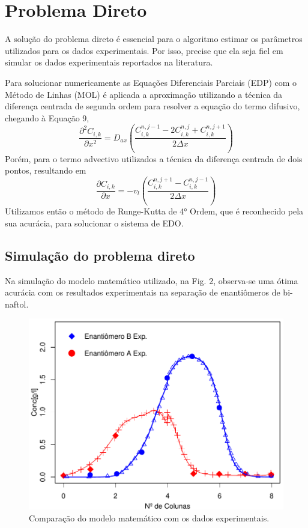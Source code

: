 \documentclass[por]{Template_SBEF}
\begin{document}
\section{Problema Direto}
A solução do problema direto é essencial para o algoritmo estimar os parâmetros utilizados para os dados experimentais. Por isso, precise que ela seja fiel em simular os dados experimentais reportados na literatura.

Para solucionar numericamente as Equações Diferenciais Parciais (EDP) com o Método de Linhas (MOL) é aplicada a aproximação utilizando a técnica da diferença centrada de segunda ordem para resolver a equação do termo difusivo, chegando à Equação 9,
\begin{equation}
\frac{\partial^2 C_{i,k}}{\partial x^2} = D_{ax}(\frac{C_{i,k}^{n,j-1} - 2C_{i,k}^{n,j} + C_{i,k}^{n,j+1}}{2\Delta x})
\end{equation}
Porém, para o termo advectivo utilizados a técnica da diferença centrada de dois pontos, resultando em
\begin{equation}
\frac{\partial C_{i,k}}{\partial x} = - v_l (\frac{C_{i,k}^{n,j+1} - C_{i,k}^{n,j-1}}{2\Delta x})
\end{equation}
Utilizamos então o método de Runge-Kutta de 4° Ordem, que é reconhecido pela sua acurácia, para solucionar o sistema de EDO.

\subsection{Simulação do problema direto}
Na simulação do modelo matemático utilizado, na Fig. 2, observa-se uma ótima acurácia com os resultados experimentais na separação de enantiômeros de bi-naftol.
\begin{figure}[!tb] 
	\centering
	\includegraphics[width=.8\columnwidth]{Arquivos/problema.pdf} 
	\caption{Comparação do modelo matemático com os dados experimentais.} 
\end{figure}
\end{document}
